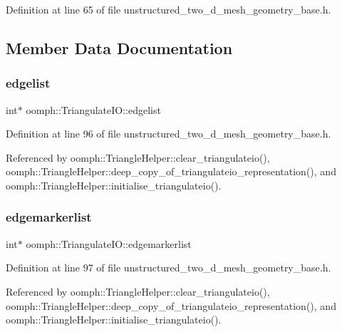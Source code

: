 Definition at line 65 of file unstructured\+\_\+two\+\_\+d\+\_\+mesh\+\_\+geometry\+\_\+base.\+h.



\subsection{Member Data Documentation}
\mbox{\label{structoomph_1_1TriangulateIO_ad5f468b0711991370f24d47aea673b0b}} 
\subsubsection{\texorpdfstring{edgelist}{edgelist}}
{\footnotesize\ttfamily int$\ast$ oomph\+::\+Triangulate\+I\+O\+::edgelist}



Definition at line 96 of file unstructured\+\_\+two\+\_\+d\+\_\+mesh\+\_\+geometry\+\_\+base.\+h.



Referenced by oomph\+::\+Triangle\+Helper\+::clear\+\_\+triangulateio(), oomph\+::\+Triangle\+Helper\+::deep\+\_\+copy\+\_\+of\+\_\+triangulateio\+\_\+representation(), and oomph\+::\+Triangle\+Helper\+::initialise\+\_\+triangulateio().

\mbox{\label{structoomph_1_1TriangulateIO_a5a2743276f51517729ed47f29722e061}} 
\subsubsection{\texorpdfstring{edgemarkerlist}{edgemarkerlist}}
{\footnotesize\ttfamily int$\ast$ oomph\+::\+Triangulate\+I\+O\+::edgemarkerlist}



Definition at line 97 of file unstructured\+\_\+two\+\_\+d\+\_\+mesh\+\_\+geometry\+\_\+base.\+h.



Referenced by oomph\+::\+Triangle\+Helper\+::clear\+\_\+triangulateio(), oomph\+::\+Triangle\+Helper\+::deep\+\_\+copy\+\_\+of\+\_\+triangulateio\+\_\+representation(), and oomph\+::\+Triangle\+Helper\+::initialise\+\_\+triangulateio().

